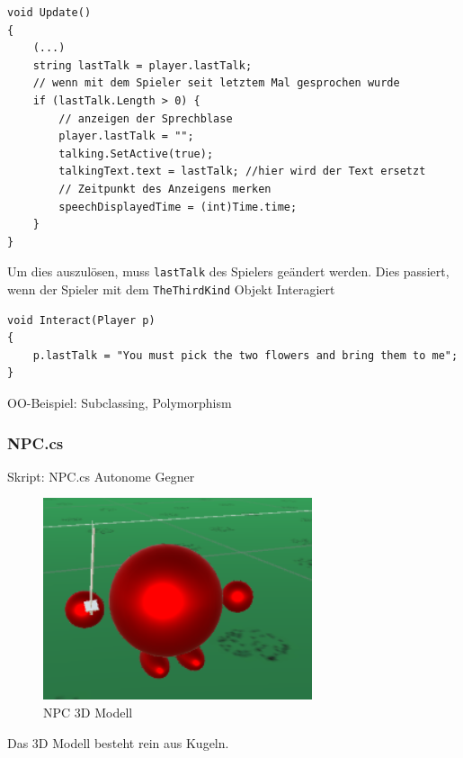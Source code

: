 \begin{lstlisting}[caption={Gesprochenes aktualisieren}]
void Update()
{
	(...)
	string lastTalk = player.lastTalk;
	// wenn mit dem Spieler seit letztem Mal gesprochen wurde
	if (lastTalk.Length > 0) {
		// anzeigen der Sprechblase
		player.lastTalk = "";
		talking.SetActive(true);
		talkingText.text = lastTalk; //hier wird der Text ersetzt
		// Zeitpunkt des Anzeigens merken
		speechDisplayedTime = (int)Time.time;
	} 
}
\end{lstlisting}
Um dies auszulösen, muss \lstinline{lastTalk} des Spielers geändert werden.
Dies passiert, wenn der Spieler mit dem \lstinline{TheThirdKind} Objekt Interagiert 
\begin{lstlisting}
void Interact(Player p)
{
	p.lastTalk = "You must pick the two flowers and bring them to me";
}
\end{lstlisting}


OO-Beispiel: Subclassing, Polymorphism

\subsubsection{NPC.cs}
Skript: NPC.cs
Autonome Gegner
\begin{figure}[H]
\includegraphics[scale=1]{screenshots/npc.png}
\caption{NPC 3D Modell}
\end{figure}
Das 3D Modell besteht rein aus Kugeln.

